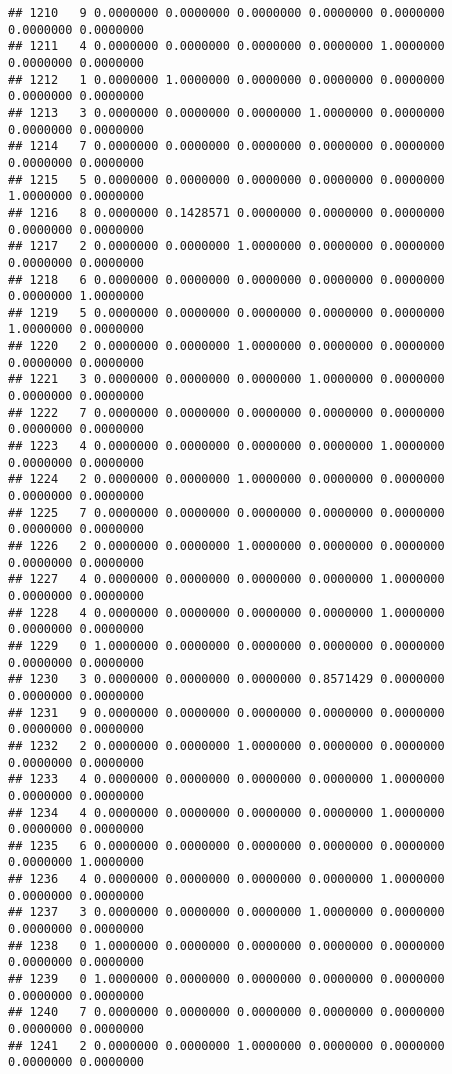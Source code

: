 \documentclass[
]{article}
\begin{document}
\begin{verbatim}
## 1210   9 0.0000000 0.0000000 0.0000000 0.0000000 0.0000000 0.0000000 0.0000000
## 1211   4 0.0000000 0.0000000 0.0000000 0.0000000 1.0000000 0.0000000 0.0000000
## 1212   1 0.0000000 1.0000000 0.0000000 0.0000000 0.0000000 0.0000000 0.0000000
## 1213   3 0.0000000 0.0000000 0.0000000 1.0000000 0.0000000 0.0000000 0.0000000
## 1214   7 0.0000000 0.0000000 0.0000000 0.0000000 0.0000000 0.0000000 0.0000000
## 1215   5 0.0000000 0.0000000 0.0000000 0.0000000 0.0000000 1.0000000 0.0000000
## 1216   8 0.0000000 0.1428571 0.0000000 0.0000000 0.0000000 0.0000000 0.0000000
## 1217   2 0.0000000 0.0000000 1.0000000 0.0000000 0.0000000 0.0000000 0.0000000
## 1218   6 0.0000000 0.0000000 0.0000000 0.0000000 0.0000000 0.0000000 1.0000000
## 1219   5 0.0000000 0.0000000 0.0000000 0.0000000 0.0000000 1.0000000 0.0000000
## 1220   2 0.0000000 0.0000000 1.0000000 0.0000000 0.0000000 0.0000000 0.0000000
## 1221   3 0.0000000 0.0000000 0.0000000 1.0000000 0.0000000 0.0000000 0.0000000
## 1222   7 0.0000000 0.0000000 0.0000000 0.0000000 0.0000000 0.0000000 0.0000000
## 1223   4 0.0000000 0.0000000 0.0000000 0.0000000 1.0000000 0.0000000 0.0000000
## 1224   2 0.0000000 0.0000000 1.0000000 0.0000000 0.0000000 0.0000000 0.0000000
## 1225   7 0.0000000 0.0000000 0.0000000 0.0000000 0.0000000 0.0000000 0.0000000
## 1226   2 0.0000000 0.0000000 1.0000000 0.0000000 0.0000000 0.0000000 0.0000000
## 1227   4 0.0000000 0.0000000 0.0000000 0.0000000 1.0000000 0.0000000 0.0000000
## 1228   4 0.0000000 0.0000000 0.0000000 0.0000000 1.0000000 0.0000000 0.0000000
## 1229   0 1.0000000 0.0000000 0.0000000 0.0000000 0.0000000 0.0000000 0.0000000
## 1230   3 0.0000000 0.0000000 0.0000000 0.8571429 0.0000000 0.0000000 0.0000000
## 1231   9 0.0000000 0.0000000 0.0000000 0.0000000 0.0000000 0.0000000 0.0000000
## 1232   2 0.0000000 0.0000000 1.0000000 0.0000000 0.0000000 0.0000000 0.0000000
## 1233   4 0.0000000 0.0000000 0.0000000 0.0000000 1.0000000 0.0000000 0.0000000
## 1234   4 0.0000000 0.0000000 0.0000000 0.0000000 1.0000000 0.0000000 0.0000000
## 1235   6 0.0000000 0.0000000 0.0000000 0.0000000 0.0000000 0.0000000 1.0000000
## 1236   4 0.0000000 0.0000000 0.0000000 0.0000000 1.0000000 0.0000000 0.0000000
## 1237   3 0.0000000 0.0000000 0.0000000 1.0000000 0.0000000 0.0000000 0.0000000
## 1238   0 1.0000000 0.0000000 0.0000000 0.0000000 0.0000000 0.0000000 0.0000000
## 1239   0 1.0000000 0.0000000 0.0000000 0.0000000 0.0000000 0.0000000 0.0000000
## 1240   7 0.0000000 0.0000000 0.0000000 0.0000000 0.0000000 0.0000000 0.0000000
## 1241   2 0.0000000 0.0000000 1.0000000 0.0000000 0.0000000 0.0000000 0.0000000

\end{verbatim}
\end{document}
